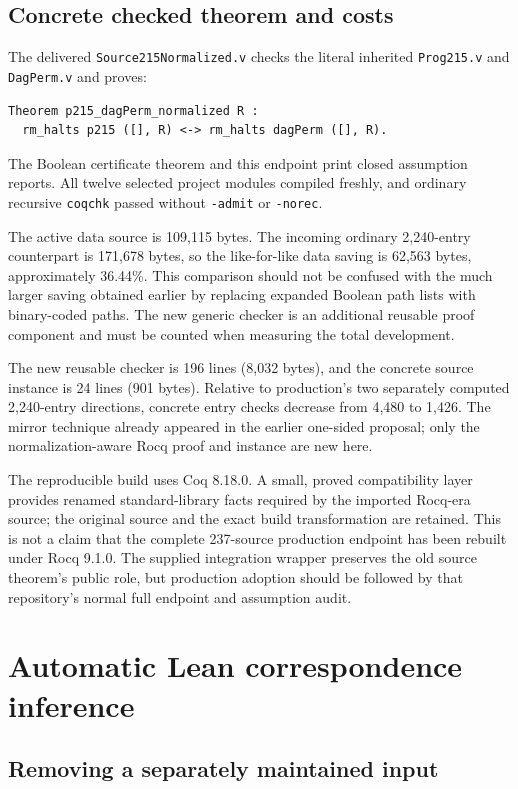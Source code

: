 \documentclass[11pt]{article}
\theoremstyle{definition}\newtheorem{definition}[theorem]{Definition}
\newcommand{\RocqStatus}{All twelve selected project modules compiled freshly, and ordinary recursive \texttt{coqchk} passed without \texttt{-admit} or \texttt{-norec}.}
\begin{document}
\subsection{Concrete checked theorem and costs}

The delivered \texttt{Source215Normalized.v} checks the literal inherited
\texttt{Prog215.v} and \texttt{DagPerm.v} and proves:
\begin{lstlisting}
Theorem p215_dagPerm_normalized R :
  rm_halts p215 ([], R) <-> rm_halts dagPerm ([], R).
\end{lstlisting}
The Boolean certificate theorem and this endpoint print closed assumption
reports. \RocqStatus

The active data source is 109,115 bytes. The incoming ordinary 2,240-entry
counterpart is 171,678 bytes, so the like-for-like data saving is 62,563 bytes,
approximately 36.44\%. This comparison should not be confused with the much
larger saving obtained earlier by replacing expanded Boolean path lists with
binary-coded paths. The new generic checker is an additional reusable proof
component and must be counted when measuring the total development.

The new reusable checker is 196 lines (8,032 bytes), and the concrete source
instance is 24 lines (901 bytes). Relative to production's two separately
computed 2,240-entry directions, concrete entry checks decrease from 4,480 to
1,426. The mirror technique already appeared in the earlier one-sided proposal;
only the normalization-aware Rocq proof and instance are new here.

\RocqMeasurements

The reproducible build uses Coq 8.18.0. A small, proved compatibility layer
provides renamed standard-library facts required by the imported Rocq-era
source; the original source and the exact build transformation are retained.
This is not a claim that the complete 237-source production endpoint has
been rebuilt under Rocq 9.1.0. The supplied integration wrapper preserves the
old source theorem's public role, but production adoption should be followed
by that repository's normal full endpoint and assumption audit.

\section{Automatic Lean correspondence inference}

\subsection{Removing a separately maintained input}
\end{document}
